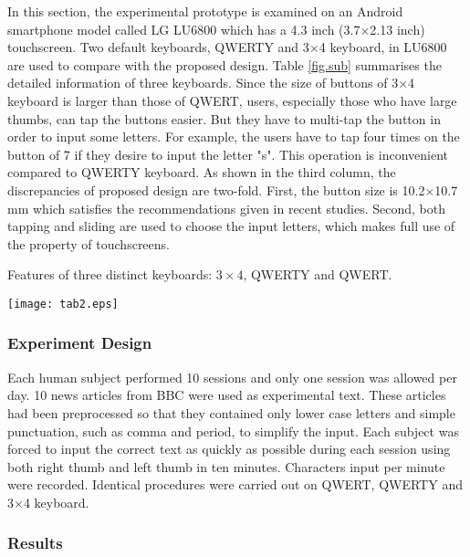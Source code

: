 \documentclass{singlecol-new}
\theoremstyle{TH}{
\newtheorem{lemma}{Lemma}
\newtheorem{theorem}[lemma]{Theorem}
\newtheorem{corrolary}[lemma]{Corrolary}
\newtheorem{conjecture}[lemma]{Conjecture}
\newtheorem{proposition}[lemma]{Proposition}
\newtheorem{claim}[lemma]{Claim}
\newtheorem{stheorem}[lemma]{Wrong Theorem}
\newtheorem{algorithm}{Algorithm}
}
\theoremstyle{THrm}{
\newtheorem{definition}{Definition}[section]
\newtheorem{question}{Question}[section]
\newtheorem{remark}{Remark}
\newtheorem{scheme}{Scheme}
}
\theoremstyle{THhit}{
\newtheorem{case}{Case}[section]
}
\begin{document}
In this section, the experimental prototype is examined on an Android smartphone model called LG LU6800 which has a 4.3 inch (3.7$\times$2.13 inch) touchscreen. Two default keyboards, QWERTY and 3$\times$4 keyboard, in LU6800 are used to compare with the proposed design. Table \ref{fig.sub} summarises the detailed information of three keyboards. Since the size of buttons of 3$\times$4 keyboard is larger than those of QWERT, users, especially those who have large thumbs, can tap the buttons easier. But they have to multi-tap the button in order to input some letters. For example, the users have to tap four times on the button of 7 if they desire to input the letter "s". This operation is inconvenient compared to QWERTY keyboard. As shown in the third column, the discrepancies of proposed design are two-fold. First, the button size is 10.2$\times$10.7 mm which satisfies the recommendations given in recent studies. Second, both tapping and sliding are used to choose the input letters, which makes full use of the property of touchscreens. \\

\begin{sidewaystable}
\centering
\caption{Features of three distinct keyboards: $3\times4$, QWERTY and QWERT.}\label{fig.sub}
  \texttt{[image: tab2.eps]}
\end{sidewaystable}


\subsubsection{Experiment Design}

Each human subject performed 10 sessions and only one session was allowed per day. 10 news articles from BBC were used as experimental text. These articles had been preprocessed so that they contained only lower case letters and simple punctuation, such as comma and period, to simplify the input. Each subject was forced to input the correct text as quickly as possible during each session using both right thumb and left thumb in ten minutes. Characters input per minute were recorded. Identical procedures were carried out on QWERT, QWERTY and 3$\times$4 keyboard. \\

\subsubsection{Results}
\end{document}
